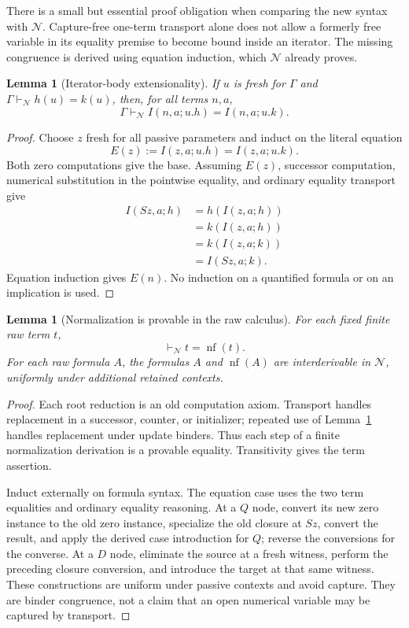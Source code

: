 \documentclass[11pt,letterpaper]{article}
\newtheorem{lemma}[theorem]{Lemma}
\theoremstyle{definition}
\theoremstyle{remark}
\begin{document}
There is a small but essential proof obligation when comparing the new
syntax with $\mathcal N$.  Capture-free one-term transport alone does not
allow a formerly free variable in its equality premise to become bound
inside an iterator.  The missing congruence is derived using equation
induction, which $\mathcal N$ already proves.

\begin{lemma}[Iterator-body extensionality]
\label{lem:fullnf-body}
If $u$ is fresh for $\Gamma$ and
$\Gamma\vdash_{\mathcal N}h(u)=k(u)$, then, for all terms $n,a$,
\[
 \Gamma\vdash_{\mathcal N}I(n,a;u.h)=I(n,a;u.k).
\]
\end{lemma}
\begin{proof}
Choose $z$ fresh for all passive parameters and induct on the literal equation
\[
 E(z):=I(z,a;u.h)=I(z,a;u.k).
\]
Both zero computations give the base.  Assuming $E(z)$, successor
computation, numerical substitution in the pointwise equality, and ordinary
equality transport give
\[
\begin{aligned}
 I(Sz,a;h)&=h(I(z,a;h))\\
          &=k(I(z,a;h))\\
          &=k(I(z,a;k))\\
          &=I(Sz,a;k).
\end{aligned}
\]
Equation induction gives $E(n)$.  No induction on a quantified formula
or on an implication is used.
\end{proof}

\begin{lemma}[Normalization is provable in the raw calculus]
\label{lem:fullnf-provable}
For each fixed finite raw term $t$,
\[
 \vdash_{\mathcal N}t=\operatorname{nf}(t).
\]
For each raw formula $A$, the formulas $A$ and $\operatorname{nf}(A)$ are
interderivable in $\mathcal N$, uniformly under additional retained contexts.
\end{lemma}
\begin{proof}
Each root reduction is an old computation axiom.  Transport handles
replacement in a successor, counter, or initializer; repeated use of
Lemma~\ref{lem:fullnf-body} handles replacement under update binders.
Thus each step of a finite normalization derivation is a provable equality.
Transitivity gives the term assertion.

Induct externally on formula syntax.  The equation case uses the two term
equalities and ordinary equality reasoning.  At a $Q$ node, convert its
new zero instance to the old zero instance, specialize the old closure at
$Sz$, convert the result, and apply the derived case introduction for $Q$;
reverse the conversions for the converse.  At a $D$ node, eliminate the
source at a fresh witness, perform the preceding closure conversion, and
introduce the target at that same witness.  These constructions are uniform
under passive contexts and avoid capture.  They are binder congruence,
not a claim that an open numerical variable may be captured by transport.
\end{proof}
\end{document}
